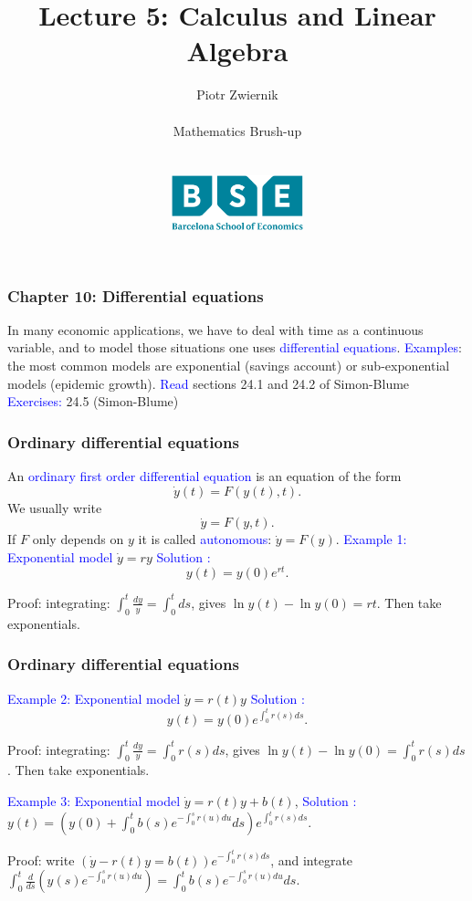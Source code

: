 \documentclass[11pt,aspectratio=169]{beamer}
\title[Calculus and Linear Algebra]{Lecture 5: Calculus and Linear Algebra}
\author[Piotr Zwiernik, Barcelona School of Economics]{Piotr Zwiernik \\ $\;$\\
Mathematics Brush-up\\ $\;$\\ $\;$\\
\includegraphics[width=1.5in]{img/bse.png}  
}
\date{}
\begin{document}
\begin{frame}
\titlepage
\end{frame}





\begin{frame}
\frametitle{Chapter 10: Differential equations}
\begin{small}
In many economic applications, we have to deal with time as a continuous variable, and to model those situations one uses \textcolor{blue}{differential equations}.
\vskip 12pt
\textcolor{blue}{Examples}: the most common models are exponential (savings account) or sub-exponential models (epidemic growth).
\vskip 12pt
\textcolor{blue}{Read}  sections 24.1 and 24.2 of Simon-Blume
\vskip 12pt
\textcolor{blue}{Exercises:} 24.5  (Simon-Blume)


\end{small}
\end{frame}

\begin{frame}
\frametitle{Ordinary differential equations}
\begin{small}
An \textcolor{blue}{ordinary first order differential equation} is an equation of the form $$\dot{y}(t)=F(y(t), t).$$
We usually write $$\dot{y}=F(y,t).$$
\vskip 12pt
 If $F$ only depends on $y$ it is called \textcolor{blue}{autonomous}: $\dot{y}=F(y)$.
\vskip 12pt
 \textcolor{blue}{Example 1: Exponential model} $\dot{y}=r y$ 
\vskip 10pt
 \textcolor{blue}{Solution :} $$y(t)=y(0) e^{rt}.$$

\begin{tiny}Proof: integrating: $\int_0^t \frac{dy}{y} =\int_0^t ds$, gives $\ln y(t)-\ln y(0)=rt$. Then take exponentials. \end{tiny}


\end{small}
\end{frame}

\begin{frame}
\frametitle{Ordinary differential equations}
\begin{small}
\textcolor{blue}{Example 2: Exponential model} $\dot{y}=r(t) y$ 
\vskip 10pt
 \textcolor{blue}{Solution :} $$y(t)=y(0) e^{\int_0^t r(s) ds}.$$

\begin{tiny}Proof: integrating: $\int_0^t \frac{dy}{y} =\int_0^t r(s) ds$, gives $\ln y(t)-\ln y(0)=\int_0^t r(s) ds$. Then take exponentials. \end{tiny}
\vskip 12pt
\textcolor{blue}{Example 3: Exponential model} $\dot{y}=r(t) y+b(t)$, 
\vskip 12pt
\textcolor{blue}{Solution :} $y(t)=\left(y(0) +\int_{0}^t b(s) e^{-\int_0^s r(u) du}ds \right)e^{\int_0^t r(s) ds} .$
\vskip 12pt
\begin{tiny}Proof: write $(\dot{y}-r(t) y=b(t))e^{-\int_0^t r(s) ds} $,
and integrate $\int_0^t \frac{d}{ds}\left(y(s)e^{-\int_0^s r(u) du} \right)  =\int_0^t b(s)e^{-\int_0^s r(u) du}ds$.  \end{tiny}


\end{small}
\end{frame}
\end{document}
